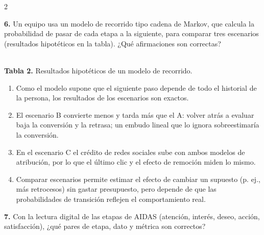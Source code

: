 \documentclass[10pt,letterpaper]{article}
\newcommand{\cas}{\framebox[1.0em]{\rule{0pt}{1.05ex}}}
\begin{document}
\begin{multicols}{2}
\begin{minipage}[t]{\columnwidth}\noindent\textbf{6.} Un equipo usa un modelo de recorrido tipo cadena de Markov, que calcula la probabilidad de pasar de cada etapa a la siguiente, para comparar tres escenarios (resultados hipotéticos en la tabla). ¿Qué afirmaciones son correctas?
\begin{center}\\[1pt]{\tiny\textbf{Tabla 2.} Resultados hipotéticos de un modelo de recorrido.}\end{center}
\vspace{1pt}\begin{enumerate}[label=\cas\ \alph*),leftmargin=2.3em,itemsep=1.2pt,topsep=1pt,parsep=0pt,partopsep=0pt]
\item Como el modelo supone que el siguiente paso depende de todo el historial de la persona, los resultados de los escenarios son exactos.
\item El escenario B convierte menos y tarda más que el A: volver atrás a evaluar baja la conversión y la retrasa; un embudo lineal que lo ignora sobreestimaría la conversión.
\item En el escenario C el crédito de redes sociales sube con ambos modelos de atribución, por lo que el último clic y el efecto de remoción miden lo mismo.
\item Comparar escenarios permite estimar el efecto de cambiar un supuesto (p. ej., más retrocesos) sin gastar presupuesto, pero depende de que las probabilidades de transición reflejen el comportamiento real.
\end{enumerate}\end{minipage}\par\vspace{3pt}
\begin{minipage}[t]{\columnwidth}\noindent\textbf{7.} Con la lectura digital de las etapas de AIDAS (atención, interés, deseo, acción, satisfacción), ¿qué pares de etapa, dato y métrica son correctos?

\end{minipage}
\end{multicols}
\end{document}
